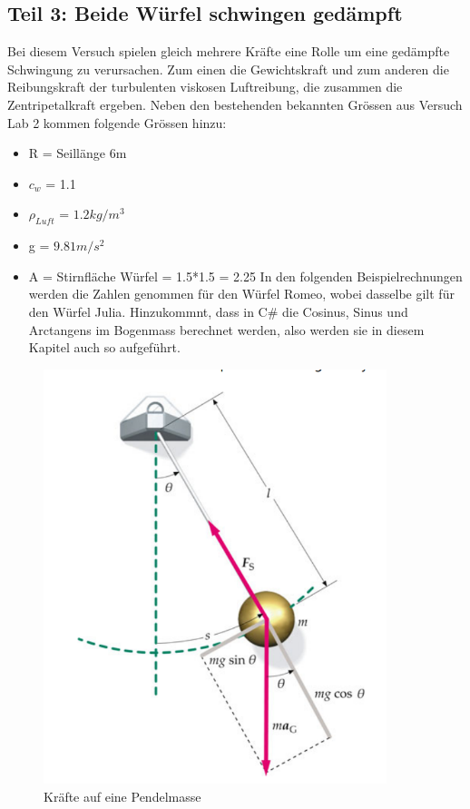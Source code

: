 \documentclass[../main.tex]{subfiles}
\begin{document}
\subsection{Teil 3: Beide Würfel schwingen gedämpft}
Bei diesem Versuch spielen gleich mehrere Kräfte eine Rolle um eine gedämpfte Schwingung zu verursachen. Zum einen die Gewichtskraft und zum anderen die Reibungskraft der turbulenten viskosen Luftreibung, die zusammen die Zentripetalkraft ergeben.
Neben den bestehenden bekannten Grössen aus Versuch Lab 2 kommen folgende Grössen hinzu:
\begin{itemize}
	\item R = Seillänge 6m
	\item $c_w$ = 1.1
	\item $\rho_{Luft}$ = $1.2kg/m^3$
	\item g = $9.81 m/s^2$
	\item A = Stirnfläche Würfel = 1.5*1.5 = 2.25 \newline
In den folgenden Beispielrechnungen werden die Zahlen genommen für den Würfel Romeo, wobei dasselbe gilt für den Würfel Julia. 	Hinzukommnt, dass in C\# die Cosinus, Sinus und Arctangens im Bogenmass berechnet werden, also werden sie in diesem Kapitel auch so aufgeführt.
\end{itemize}
     \begin{figure}[H]
               \begin{center}
                   \centerline{\includegraphics[width=100mm]{./images/Lab3Unity/KraeftePendel.png}}
                   \caption{Kräfte auf eine Pendelmasse \cite{tiplerpaula.PhysikFurStudierende}}
                   \label{fig:Pendel}
               \end{center}
     \end{figure}
\end{document}

